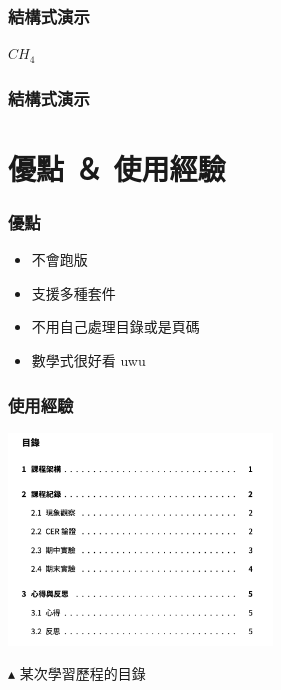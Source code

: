 \documentclass[mathserif]{beamer}
\begin{document}
\begin{frame}
    \frametitle{結構式演示}
    \begin{center}
        \vspace{0.5cm}

        $CH_4$
    \end{center}
\end{frame}

\begin{frame}
    \frametitle{結構式演示}
    \begin{center}
    \end{center}
\end{frame}

\section{優點 ＆ 使用經驗}

\begin{frame}
    \frametitle{優點}
    \begin{itemize}
        \item 不會跑版
        \item 支援多種套件
        \item 不用自己處理目錄或是頁碼
        \item 數學式很好看 uwu
    \end{itemize}
\end{frame}

\begin{frame}
    \frametitle{使用經驗}
    \begin{center}
        \includegraphics[width=7.0cm]{img/example1.png}
        
        $\blacktriangle$ 某次學習歷程的目錄
    \end{center}
\end{frame}
\end{document}
